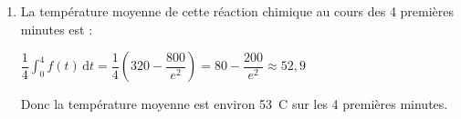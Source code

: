 \begin{enumerate}
\begin{enumerate}
On pose $u(t) = 60 t + 40$ et $v'(t) = e^{-0{,}5 t}$ alors $u'(t)=60$ et $v(t)= -2 e^{-0{,}5 t}$.

les fonctions $u$ et $v$ sont dérivables et leurs fonctions dérivées sont continues donc d'après la formules d'intégration par parties :

$ \displaystyle\int_0^4 (60 t + 40) e^{-0{,}5t} \text{d}t  = \left[ (60 t + 40)(-2 e^{-0{,}5t}) \right]_0^4 - \int_0^4 -2 \times 60 e^{-0{,}5t} \text{d}t = \left[(-120t -80) e^{-0{,}5t}\right]_0^4 + 120 \int_0^4 e^{-0{,}5t} \text{d}t$

$= -560e^{-2} +80 + 120 \left[-2 e^{-0{,}5t}\right]_0^4  =-560e^{-2}  +80+ 120 (-2 e^{-2} + 2)  = -560 e^{-2} + 80  -240 e^{-2} + 240$

$= 320 - 800 e^{-2} = 320 -\dfrac{800}{\mathrm{e}^{2}}$.

		\item La température moyenne de cette réaction chimique au cours des 4 premières minutes est :

$\dfrac{1}{4}\displaystyle \int_0^4 f(t)\,\text{d}t =\dfrac{1}{4} \left(320 - \dfrac{800}{e^2} \right) = 80 - \dfrac{200}{e^2} \approx  52,9$

Donc la température moyenne est environ 53~\degres C sur les 4 premières minutes.
	\end{enumerate}
\end{enumerate}
